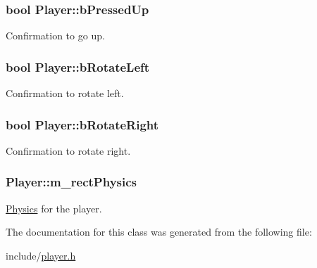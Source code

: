 \subsubsection[{\texorpdfstring{b\+Pressed\+Up}{bPressedUp}}]{\setlength{\rightskip}{0pt plus 5cm}bool Player\+::b\+Pressed\+Up\hspace{0.3cm}{\ttfamily [private]}}\hypertarget{class_player_ad00b7a7e4920b62e13c152a2374c66dd}{}\label{class_player_ad00b7a7e4920b62e13c152a2374c66dd}
Confirmation to go up. 
\subsubsection[{\texorpdfstring{b\+Rotate\+Left}{bRotateLeft}}]{\setlength{\rightskip}{0pt plus 5cm}bool Player\+::b\+Rotate\+Left\hspace{0.3cm}{\ttfamily [private]}}\hypertarget{class_player_ae2fd38e391d041ade292c8fd2a417f4f}{}\label{class_player_ae2fd38e391d041ade292c8fd2a417f4f}
Confirmation to rotate left. 
\subsubsection[{\texorpdfstring{b\+Rotate\+Right}{bRotateRight}}]{\setlength{\rightskip}{0pt plus 5cm}bool Player\+::b\+Rotate\+Right\hspace{0.3cm}{\ttfamily [private]}}\hypertarget{class_player_ab898f2f67f989df21804ecb72f4d25b1}{}\label{class_player_ab898f2f67f989df21804ecb72f4d25b1}
Confirmation to rotate right. 
\subsubsection[{\texorpdfstring{m\+\_\+rect\+Physics}{m_rectPhysics}}]{ Player\+::m\+\_\+rect\+Physics\hspace{0.3cm}{\ttfamily [private]}}\hypertarget{class_player_adc5a0f2ba8dd25317f817e4f65de9cae}{}\label{class_player_adc5a0f2ba8dd25317f817e4f65de9cae}
\hyperlink{class_physics}{Physics} for the player. 

The documentation for this class was generated from the following file\+:\begin{DoxyCompactItemize}
\item 
include/\hyperlink{player_8h}{player.\+h}\end{DoxyCompactItemize}
